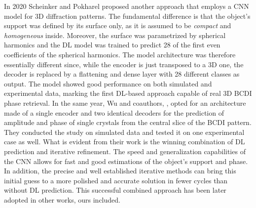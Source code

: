 In 2020 Scheinker and Pokharel proposed another approach \cite{scheinker_adaptive_2020}
that employs a CNN model for 3D diffraction patterns. The fundamental difference is that the object's support was defined 
by its surface only, as it is assumed to be \textit{compact} and \textit{homogeneous} inside. Moreover, the surface was
parametrized by spherical harmonics and the DL model was trained to predict 28 of the first even coefficients of the spherical
harmonics. The model architecture was therefore essentially different since, while the encoder is just transposed to a 3D 
one, the decoder is replaced by a flattening and dense layer with 28 different classes as output. The model showed good performance
on both simulated and experimental data, marking the first DL-based approach capable of real 3D BCDI phase retrieval.
In the same year, Wu and coauthors, \cite{Wu2021}, opted for an architecture made of a single encoder and two identical decoders for the prediction of 
amplitude and phase of single crystals from the central slice of the BCDI pattern. They conducted the study on simulated 
data and tested it on one experimental case as well. What is evident from their work is the winning combination of DL prediction
and iterative refinement. The speed and generalization capabilities of the CNN allows for fast and good estimations of the 
object's support and phase. In addition, the precise and well established iterative methods can bring this initial guess to a 
more polished and accurate solution in fewer cycles than without DL prediction. This successful combined approach has been 
later adopted in other works, ours included. 

